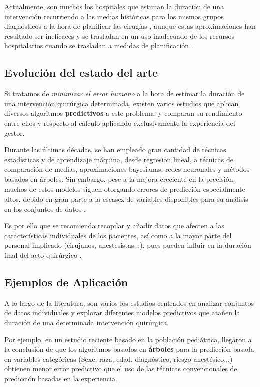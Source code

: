 Actualmente, son muchos los hospitales que estiman la duración de una intervención recurriendo a las medias históricas para los mismos grupos diagnósticos a la hora de planificar las cirugías\cite{Wright1996StatisticalTime} , aunque estas aproximaciones han resultado ser ineficaces y se trasladan en un uso inadecuado de los recursos hospitalarios cuando se trasladan a medidas de planificación \cite{ShahabiKargar2014PredictingSurgery}.

\subsection{Evolución del estado del arte}

Si tratamos de \textit{minimizar el error humano} a la hora de estimar la duración de una intervención quirúrgica determinada, existen varios estudios que aplican diversos algoritmos \textbf{predictivos} a este problema, y comparan su rendimiento entre ellos y respecto al cálculo aplicando exclusivamente la experiencia del gestor.

Durante las últimas décadas, se han empleado gran cantidad de técnicas estadísticas y de aprendizaje máquina, desde regresión lineal, a técnicas de comparación de medias, aproximaciones bayesianas, redes neuronales y métodos basados en árboles.
Sin embargo, pese a la mejora creciente en la precisión, muchos de estos modelos siguen otorgando errores de predicción especialmente altos, debido en gran parte a la escasez de variables disponibles para su análisis en los conjuntos de datos \cite{ShahabiKargar2014PredictingSurgery}.

Es por ello que se recomienda recopilar y añadir datos que afecten a las características individuales de los pacientes, así como a la mayor parte del personal implicado (cirujanos, anestesistas...), pues pueden influir en la duración final del acto quirúrgico \cite{Wright1996StatisticalTime}.

\subsection{Ejemplos de Aplicación}

A lo largo de la literatura, son varios los estudios centrados en analizar conjuntos de datos individuales y explorar diferentes modelos predictivos que atañen la duración de una determinada intervención quirúrgica.

Por ejemplo, en un estudio reciente \cite{Master2017ImprovingLearning} basado en la población pediátrica, llegaron a la conclusión de que los algoritmos basados en \textbf{árboles} para la predicción basada en variables categóricas (Sexc, raza, edad, diagnóstico, riesgo anestésico...) obtienen menor error predictivo que el uso de las técnicas convencionales de predicción basadas en la experiencia.

